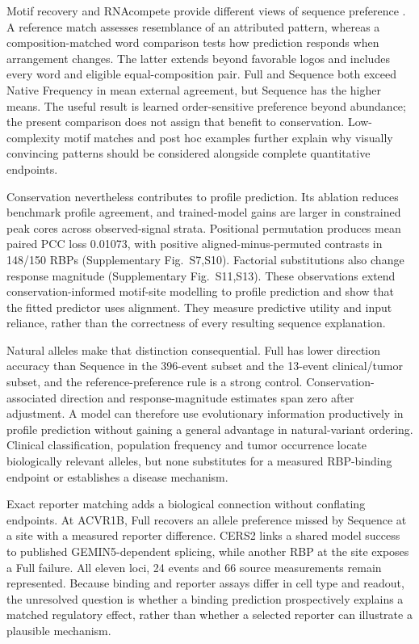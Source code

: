 \documentclass[webpdf,contemporary,large]{oup-authoring-template}
\newcommand{\supfig}[1]{Supplementary Fig.~#1}
\begin{document}
Motif recovery and RNAcompete provide different views of sequence preference \citep{ray2013compendium}. A reference match assesses resemblance of an attributed pattern, whereas a composition-matched word comparison tests how prediction responds when arrangement changes. The latter extends beyond favorable logos and includes every word and eligible equal-composition pair. Full and Sequence both exceed Native Frequency in mean external agreement, but Sequence has the higher means. The useful result is learned order-sensitive preference beyond abundance; the present comparison does not assign that benefit to conservation. Low-complexity motif matches and post hoc examples further explain why visually convincing patterns should be considered alongside complete quantitative endpoints.

Conservation nevertheless contributes to profile prediction. Its ablation reduces benchmark profile agreement, and trained-model gains are larger in constrained peak cores across observed-signal strata. Positional permutation produces mean paired PCC loss 0.01073, with positive aligned-minus-permuted contrasts in 148/150 RBPs (\supfig{S7,S10}). Factorial substitutions also change response magnitude (\supfig{S11,S13}). These observations extend conservation-informed motif-site modelling \citep{zhang2013mcarts} to profile prediction and show that the fitted predictor uses alignment. They measure predictive utility and input reliance, rather than the correctness of every resulting sequence explanation.

Natural alleles make that distinction consequential. Full has lower direction accuracy than Sequence in the 396-event subset and the 13-event clinical/tumor subset, and the reference-preference rule is a strong control. Conservation-associated direction and response-magnitude estimates span zero after adjustment. A model can therefore use evolutionary information productively in profile prediction without gaining a general advantage in natural-variant ordering. Clinical classification, population frequency and tumor occurrence locate biologically relevant alleles, but none substitutes for a measured RBP-binding endpoint or establishes a disease mechanism.

Exact reporter matching adds a biological connection without conflating endpoints. At ACVR1B, Full recovers an allele preference missed by Sequence at a site with a measured reporter difference. CERS2 links a shared model success to published GEMIN5-dependent splicing, while another RBP at the site exposes a Full failure. All eleven loci, 24 events and 66 source measurements remain represented. Because binding and reporter assays differ in cell type and readout, the unresolved question is whether a binding prediction prospectively explains a matched regulatory effect, rather than whether a selected reporter can illustrate a plausible mechanism.
\end{document}
